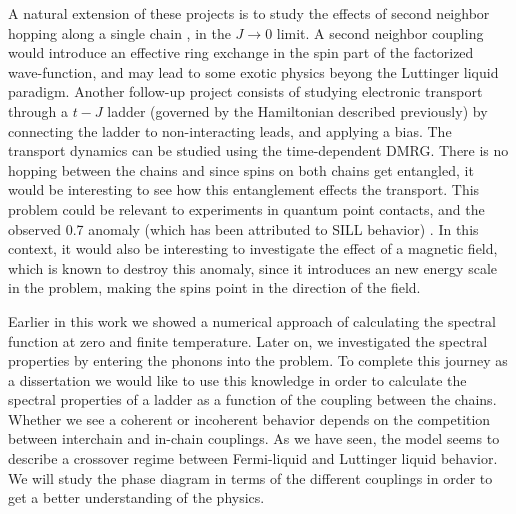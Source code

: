 \documentclass[article,11pt]{revtex4}
\begin{document}
A natural extension of these projects is to study the effects of second neighbor hopping along a single chain \cite{Mishmash2014,Jiang,Mishmash2011}, in the $J \rightarrow 0$ limit. A second neighbor coupling would introduce an effective ring exchange in the spin part of the factorized wave-function, and may lead to some exotic physics beyong the Luttinger liquid paradigm. 
Another follow-up  project consists of studying electronic transport through a $t-J$ ladder (governed by the Hamiltonian described previously) by connecting the ladder to non-interacting leads, and applying a bias. The transport dynamics can be studied using the time-dependent DMRG. There is no hopping between the chains and since spins on both chains get entangled, it would be interesting to see how this entanglement effects the transport. This problem could be relevant to experiments in quantum point contacts, and the observed 0.7 anomaly (which has been attributed to SILL behavior) \cite{Matveev,Koop2007,Micolich2011,Meir,Aryanpour}. 
In this context, it would also be interesting to investigate the effect of a magnetic field, which is known to destroy this anomaly, since it introduces an new energy scale in the problem, making the spins point in the direction of the field.

Earlier in this work we showed a numerical approach of calculating the spectral function at zero and finite temperature. Later on, we investigated the spectral properties by entering the phonons into the problem. To complete this journey as a dissertation we would like to use this knowledge in order to calculate the spectral properties of a ladder as a function of the coupling between the chains. Whether we see a coherent or incoherent behavior depends on the competition between interchain and in-chain couplings. As we have seen, the model seems to describe a crossover regime between Fermi-liquid and Luttinger liquid behavior. We will study the phase diagram in terms of the different couplings in order to get a better understanding of the physics.
\end{document}
